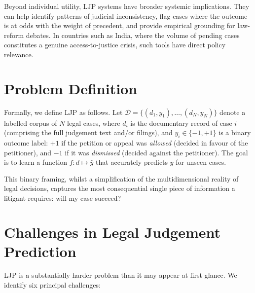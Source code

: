 \documentclass[12pt,a4paper]{report}
\begin{document}
Beyond individual utility, LJP systems have broader systemic implications. They can help identify patterns of judicial inconsistency, flag cases where the outcome is at odds with the weight of precedent, and provide empirical grounding for law-reform debates. In countries such as India, where the volume of pending cases constitutes a genuine access-to-justice crisis, such tools have direct policy relevance.

\section{Problem Definition}
\label{sec:problem_definition}

Formally, we define LJP as follows. Let $\mathcal{D} = \{(d_1, y_1), \ldots, (d_N, y_N)\}$ denote a labelled corpus of $N$ legal cases, where $d_i$ is the documentary record of case $i$ (comprising the full judgement text and/or filings), and $y_i \in \{-1, +1\}$ is a binary outcome label: $+1$ if the petition or appeal was \textit{allowed} (decided in favour of the petitioner), and $-1$ if it was \textit{dismissed} (decided against the petitioner). The goal is to learn a function $f : d \mapsto \hat{y}$ that accurately predicts $y$ for unseen cases.

This binary framing, whilst a simplification of the multidimensional reality of legal decisions, captures the most consequential single piece of information a litigant requires: will my case succeed?

\section{Challenges in Legal Judgement Prediction}
\label{sec:challenges}

LJP is a substantially harder problem than it may appear at first glance. We identify six principal challenges:
\end{document}
